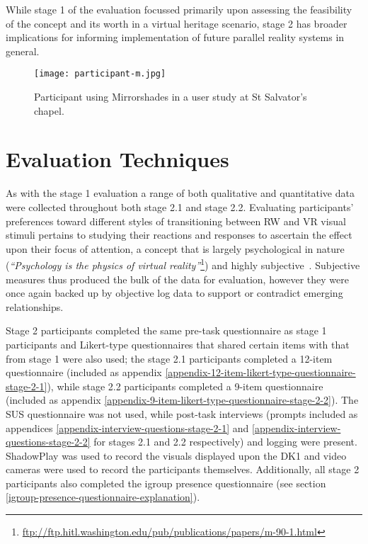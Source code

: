 While stage 1 of the evaluation focussed primarily upon assessing the feasibility of the concept and its worth in a virtual heritage scenario, stage 2 has broader implications for informing implementation of future parallel reality systems in general.

\begin{figure}[ht]
	\begin{center}
		\texttt{[image: participant-m.jpg]}
		\caption{Participant using Mirrorshades in a user study at St Salvator's chapel.}
		\label{participant-m.jpg}
	\end{center}
\end{figure}


\section{Evaluation Techniques}
\label{stage-2-1-evaluation-techniques}
As with the stage 1 evaluation a range of both qualitative and quantitative data were collected throughout both stage 2.1 and stage 2.2. Evaluating participants' preferences toward different styles of transitioning between RW and VR visual stimuli pertains to studying their reactions and responses to ascertain the effect upon their focus of attention, a concept that is largely psychological in nature (\textit{``Psychology is the physics of virtual reality''}\footnote{\url{ftp://ftp.hitl.washington.edu/pub/publications/papers/m-90-1.html}}) and highly subjective~\cite{Ijsselsteijn2001}. Subjective measures thus produced the bulk of the data for evaluation, however they were once again backed up by objective log data to support or contradict emerging relationships.

Stage 2 participants completed the same pre-task questionnaire as stage 1 participants and Likert-type questionnaires that shared certain items with that from stage 1 were also used; the stage 2.1 participants completed a 12-item questionnaire (included as appendix \ref{appendix-12-item-likert-type-questionnaire-stage-2-1}), while stage 2.2 participants completed a 9-item questionnaire (included as appendix \ref{appendix-9-item-likert-type-questionnaire-stage-2-2}). The SUS questionnaire was not used, while post-task interviews (prompts included as appendices \ref{appendix-interview-questions-stage-2-1} and \ref{appendix-interview-questions-stage-2-2} for stages 2.1 and 2.2 respectively) and logging were present. ShadowPlay was used to record the visuals displayed upon the DK1 and video cameras were used to record the participants themselves. Additionally, all stage 2 participants also completed the igroup presence questionnaire (see section \ref{igroup-presence-questionnaire-explanation}).

